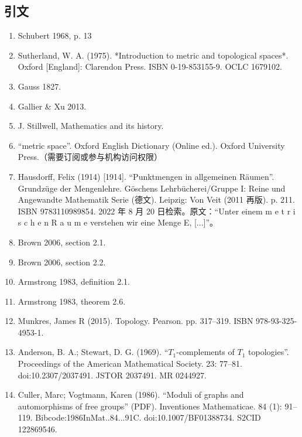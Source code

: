 \subsection{引文}
\begin{enumerate}
\item Schubert 1968, p. 13
\item Sutherland, W. A. (1975). *Introduction to metric and topological spaces*. Oxford [England]: Clarendon Press. ISBN 0-19-853155-9. OCLC 1679102.
\item Gauss 1827.
\item Gallier & Xu 2013.
\item J. Stillwell, Mathematics and its history.
\item “metric space”. Oxford English Dictionary (Online ed.). Oxford University Press.（需要订阅或参与机构访问权限）
\item  Hausdorff, Felix (1914) [1914]. “Punktmengen in allgemeinen Räumen”. Grundzüge der Mengenlehre. Göschens Lehrbücherei/Gruppe I: Reine und Angewandte Mathematik Serie (德文). Leipzig: Von Veit (2011 再版). p. 211. ISBN 9783110989854. 2022 年 8 月 20 日检索。原文：“Unter einem m e t r i s c h e n R a u m e verstehen wir eine Menge E, [...]”。
\item Brown 2006, section 2.1.
\item Brown 2006, section 2.2.
\item Armstrong 1983, definition 2.1.
\item Armstrong 1983, theorem 2.6.
\item Munkres, James R (2015). Topology. Pearson. pp. 317–319. ISBN 978-93-325-4953-1.
\item Anderson, B. A.; Stewart, D. G. (1969). “$T_1$-complements of $T_1$ topologies”. Proceedings of the American Mathematical Society. 23: 77–81. doi:10.2307/2037491. JSTOR 2037491. MR 0244927.
\item Culler, Marc; Vogtmann, Karen (1986). “Moduli of graphs and automorphisms of free groups” (PDF). Inventiones Mathematicae. 84 (1): 91–119. Bibcode:1986InMat..84...91C. doi:10.1007/BF01388734. S2CID 122869546.
\end{enumerate}
